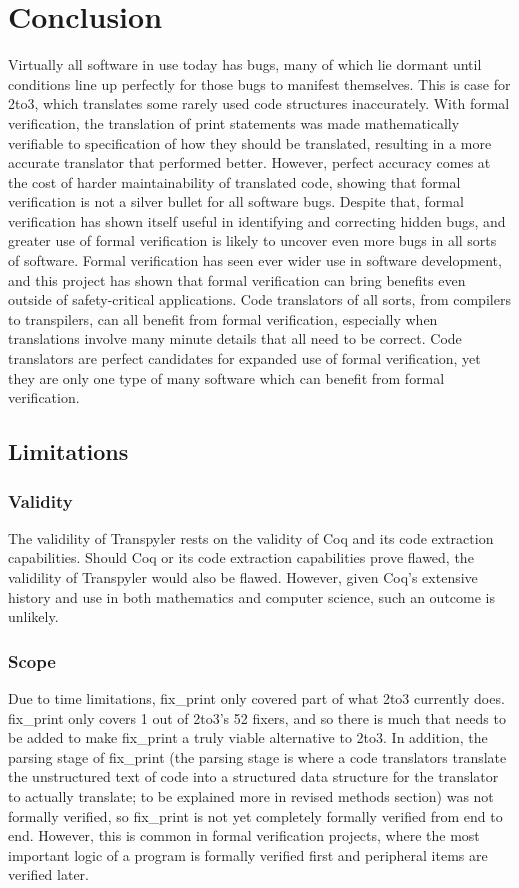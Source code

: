 \section{Conclusion}
Virtually all software in use today has bugs, many of which lie dormant until conditions line up perfectly for those bugs to manifest themselves. This is case for 2to3, which translates some rarely used code structures inaccurately. With formal verification, the translation of print statements was made mathematically verifiable to specification of how they should be translated, resulting in a more accurate translator that performed better. However, perfect accuracy comes at the cost of harder maintainability of translated code, showing that formal verification is not a silver bullet for all software bugs. Despite that, formal verification has shown itself useful in identifying and correcting hidden bugs, and greater use of formal verification is likely to uncover even more bugs in all sorts of software. Formal verification has seen ever wider use in software development, and this project has shown that formal verification can bring benefits even outside of safety-critical applications. Code translators of all sorts, from compilers to transpilers, can all benefit from formal verification, especially when translations involve many minute details that all need to be correct. Code translators are perfect candidates for expanded use of formal verification, yet they are only one type of many software which can benefit from formal verification.

\subsection{Limitations}

\subsubsection{Validity}
The validility of Transpyler rests on the validity of Coq and its code extraction capabilities. Should Coq or its code extraction capabilities prove flawed, the validility of Transpyler would also be flawed. However, given Coq's extensive history and use in both mathematics and computer science, such an outcome is unlikely.

\subsubsection{Scope}
Due to time limitations, fix\_print only covered part of what 2to3 currently does. fix\_print only covers 1 out of 2to3's 52 fixers, and so there is much that needs to be added to make fix\_print a truly viable alternative to 2to3. In addition, the parsing stage of fix\_print (the parsing stage is where a code translators translate the unstructured text of code into a structured data structure for the translator to actually translate; to be explained more in revised methods section) was not formally verified, so fix\_print is not yet completely formally verified from end to end. However, this is common in formal verification projects, where the most important logic of a program is formally verified first and peripheral items are verified later.

